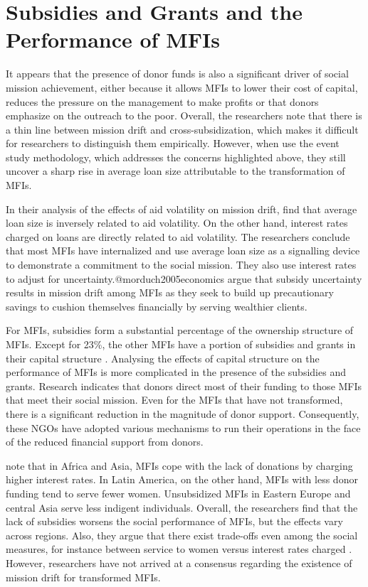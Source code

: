 \documentclass[a4paper, nobind]{templates/ociamthesis}
\begin{document}
\hypertarget{subsidies-and-grants-and-the-performance-of-mfis}{%
\section{Subsidies and Grants and the Performance of MFIs}\label{subsidies-and-grants-and-the-performance-of-mfis}}

\noindent It appears that the presence of donor funds is also a significant driver of social mission achievement, either because it allows MFIs to lower their cost of capital, reduces the pressure on the management to make profits or that donors emphasize on the outreach to the poor. Overall, the researchers note that there is a thin line between mission drift and cross-subsidization, which makes it difficult for researchers to distinguish them empirically. However, when \textcite{d2017ngos} use the event study methodology, which addresses the concerns highlighted above, they still uncover a sharp rise in average loan size attributable to the transformation of MFIs.

In their analysis of the effects of aid volatility on mission drift, \textcite{d2017ngos} find that average loan size is inversely related to aid volatility. On the other hand, interest rates charged on loans are directly related to aid volatility. The researchers conclude that most MFIs have internalized and use average loan size as a signalling device to demonstrate a commitment to the social mission. They also use interest rates to adjust for uncertainty.@morduch2005economics argue that subsidy uncertainty results in mission drift among MFIs as they seek to build up precautionary savings to cushion themselves financially by serving wealthier clients.

For MFIs, subsidies form a substantial percentage of the ownership structure of MFIs. Except for 23\%, the other MFIs have a portion of subsidies and grants in their capital structure \autocite{d2017ngos}. Analysing the effects of capital structure on the performance of MFIs is more complicated in the presence of the subsidies and grants. Research indicates that donors direct most of their funding to those MFIs that meet their social mission. Even for the MFIs that have not transformed, there is a significant reduction in the magnitude of donor support. Consequently, these NGOs have adopted various mechanisms to run their operations in the face of the reduced financial support from donors.

\textcite{d2017ngos} note that in Africa and Asia, MFIs cope with the lack of donations by charging higher interest rates. In Latin America, on the other hand, MFIs with less donor funding tend to serve fewer women. Unsubsidized MFIs in Eastern Europe and central Asia serve less indigent individuals. Overall, the researchers find that the lack of subsidies worsens the social performance of MFIs, but the effects vary across regions. Also, they argue that there exist trade-offs even among the social measures, for instance between service to women versus interest rates charged \autocite{d2013unsubsidized}. However, researchers have not arrived at a consensus regarding the existence of mission drift for transformed MFIs.
\end{document}
